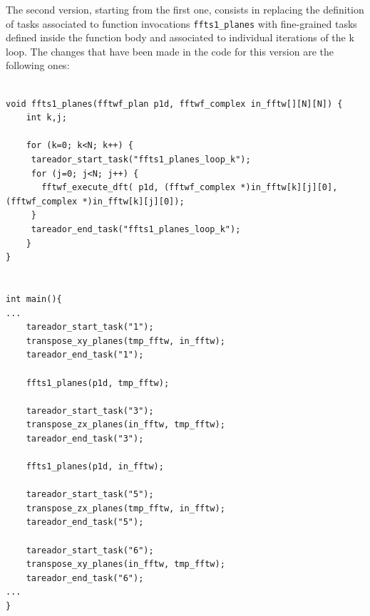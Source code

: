 \documentclass[12]{article}
\begin{document}
The second version, starting from the first one, consists in replacing the definition of tasks associated to function invocations \texttt{ffts1\_planes} with fine-grained tasks defined inside the function body and associated to individual iterations of the k loop. The changes that have been made in the code for this version are the following ones: 
\\ \medskip
\begin{lstlisting}

void ffts1_planes(fftwf_plan p1d, fftwf_complex in_fftw[][N][N]) {
    int k,j;

    for (k=0; k<N; k++) {
     tareador_start_task("ffts1_planes_loop_k");
     for (j=0; j<N; j++) {
       fftwf_execute_dft( p1d, (fftwf_complex *)in_fftw[k][j][0], (fftwf_complex *)in_fftw[k][j][0]);
     }
     tareador_end_task("ffts1_planes_loop_k");
    }
}


int main(){
...
    tareador_start_task("1");
    transpose_xy_planes(tmp_fftw, in_fftw);
    tareador_end_task("1");

    ffts1_planes(p1d, tmp_fftw);

    tareador_start_task("3");	
    transpose_zx_planes(in_fftw, tmp_fftw);
    tareador_end_task("3");

    ffts1_planes(p1d, in_fftw);

    tareador_start_task("5");
    transpose_zx_planes(tmp_fftw, in_fftw);
    tareador_end_task("5");

    tareador_start_task("6");
    transpose_xy_planes(in_fftw, tmp_fftw);
    tareador_end_task("6");
...
}

\end{lstlisting}
\end{document}
